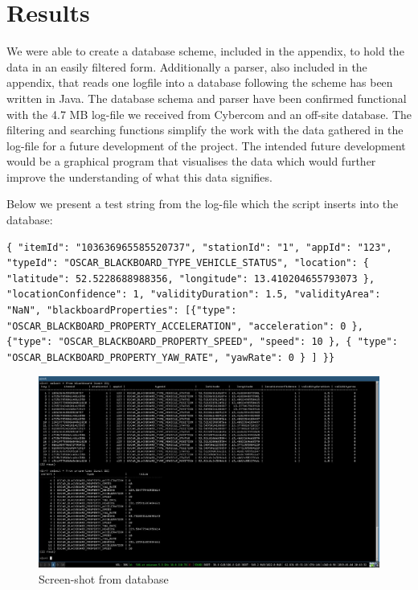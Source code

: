 \section{Results}

We were able to create a database scheme, included in the appendix, to hold the data in an easily filtered form. Additionally a parser, also included in the appendix, that reads one logfile into a database following the scheme has been written in Java. 
The database schema and parser have been confirmed functional with the 4.7 MB log-file we received from Cybercom and an off-site database. The filtering and searching functions simplify the work with the data gathered in the log-file for a future development of the project. The intended future development would be a graphical program that visualises the data which would further improve the understanding of what this data signifies. 

Below we present a test string from the log-file which the script inserts into the database:

\begin{lstlisting}
{ "itemId": "103636965585520737", "stationId": "1", "appId": "123", "typeId": "OSCAR_BLACKBOARD_TYPE_VEHICLE_STATUS", "location": { "latitude": 52.5228688988356, "longitude": 13.410204655793073 }, "locationConfidence": 1, "validityDuration": 1.5, "validityArea": "NaN", "blackboardProperties": [{"type": "OSCAR_BLACKBOARD_PROPERTY_ACCELERATION", "acceleration": 0 }, {"type": "OSCAR_BLACKBOARD_PROPERTY_SPEED", "speed": 10 }, { "type": "OSCAR_BLACKBOARD_PROPERTY_YAW_RATE", "yawRate": 0 } ] }}
\end{lstlisting}

\begin{figure}[H]
    \centering
    \includegraphics[scale=0.3]{images/db-screenshot.jpg}
    \caption{Screen-shot from database}
\end{figure}